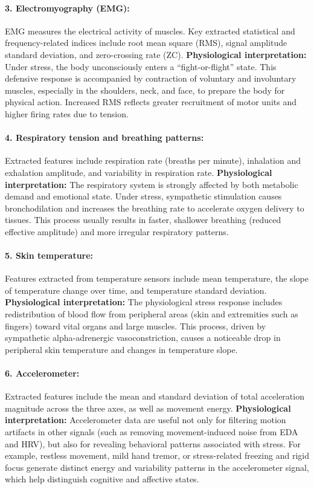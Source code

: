 \documentclass[12pt,a4paper]{article}
\begin{document}
	\paragraph{3. Electromyography (EMG):}
	EMG measures the electrical activity of muscles. Key extracted statistical and frequency-related indices include root mean square (RMS), signal amplitude standard deviation, and zero-crossing rate (ZC).  
	\textbf{Physiological interpretation:} Under stress, the body unconsciously enters a ``fight-or-flight'' state. This defensive response is accompanied by contraction of voluntary and involuntary muscles, especially in the shoulders, neck, and face, to prepare the body for physical action. Increased RMS reflects greater recruitment of motor units and higher firing rates due to tension.
	
	\paragraph{4. Respiratory tension and breathing patterns:}
	Extracted features include respiration rate (breaths per minute), inhalation and exhalation amplitude, and variability in respiration rate.  
	\textbf{Physiological interpretation:} The respiratory system is strongly affected by both metabolic demand and emotional state. Under stress, sympathetic stimulation causes bronchodilation and increases the breathing rate to accelerate oxygen delivery to tissues. This process usually results in faster, shallower breathing (reduced effective amplitude) and more irregular respiratory patterns.
	
	\paragraph{5. Skin temperature:}
	Features extracted from temperature sensors include mean temperature, the slope of temperature change over time, and temperature standard deviation.  
	\textbf{Physiological interpretation:} The physiological stress response includes redistribution of blood flow from peripheral areas (skin and extremities such as fingers) toward vital organs and large muscles. This process, driven by sympathetic alpha-adrenergic vasoconstriction, causes a noticeable drop in peripheral skin temperature and changes in temperature slope.
	
	\paragraph{6. Accelerometer:}
	Extracted features include the mean and standard deviation of total acceleration magnitude across the three axes, as well as movement energy.  
	\textbf{Physiological interpretation:} Accelerometer data are useful not only for filtering motion artifacts in other signals (such as removing movement-induced noise from EDA and HRV), but also for revealing behavioral patterns associated with stress. For example, restless movement, mild hand tremor, or stress-related freezing and rigid focus generate distinct energy and variability patterns in the accelerometer signal, which help distinguish cognitive and affective states.
	
\end{document}
